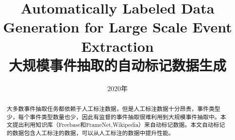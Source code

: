\documentclass[UTF8]{ctexart}
\begin{document}
	\thispagestyle{empty}
	\newtheorem{example}{例}             %
	\newtheorem{algorithm}{算法}
	\newtheorem{theorem}{定理}[section]  %
	\newtheorem{definition}{定义}
	\newtheorem{axiom}{公理}
	\newtheorem{property}{性质}
	\newtheorem{proposition}{命题}
	\newtheorem{lemma}{引理}
	\newtheorem{corollary}{推论}
	\newtheorem{remark}{注解}
	\newtheorem{condition}{条件}
	\newtheorem{conclusion}{结论}
	\newtheorem{assumption}{假设}
	
	\renewcommand{\contentsname}{目录}  %
	\renewcommand{\abstractname}{摘要}  %
	\renewcommand{\refname}{参考文献}   %
	\renewcommand{\indexname}{索引}
	\renewcommand{\figurename}{图}
	\renewcommand{\tablename}{表}
	\renewcommand{\appendixname}{附录}
	\renewcommand{\algorithm}{算法}
	\renewcommand{\baselinestretch}{1.2}



	\title{Automatically Labeled Data Generation for Large Scale Event Extraction\\大规模事件抽取的自动标记数据生成}
	
	\date{2020年}
	\pagestyle{plain}  %
	\thispagestyle{empty}  %
	\maketitle
	\tableofcontents
	
	\newpage
	  
	\begin{abstract}
	
	大多数事件抽取任务都依赖于人工标注数据，但是人工标注数据十分昂贵，事件类型少，每个事件类型数量也少，因此有监督的事件抽取很难利用到大规模事件抽取中。本文提出利用知识库（Freebase和FrameNet,Wikipedia）来自动标记数据。本文自动标记的数据包含人工标注的数据，可以从人工标注的数据中提升性能。
	
	\end{abstract}

	\newpage
	\setcounter{page}{1}  %
\end{document}
